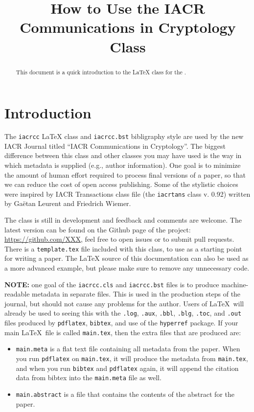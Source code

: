 \documentclass{iacrcc}
\title[running  = {The iacrcc class},
       onclick  = {https://github.com/IACR/latex},
       subtitle = {LaTeX Class Documentation (v0.10)},
      ]
      {How to Use the IACR Communications in Cryptology Class}
\affiliation[ror      = 031v4g827,
             onclick  = {https://www.nxp.com},
             street   = {Interleuvenlaan 80},
             city     = {Leuven},
             postcode = {3001},
             country  = {Belgium}
            ]{NXP Semiconductors}
\affiliation{Self}
\begin{document}
\maketitle


\begin{abstract}
  This document is a quick introduction to the \LaTeX{} class for the
  \publname{}.
\end{abstract}

\tableofcontents{}

\section*{Introduction}

The \texttt{iacrcc} \LaTeX{} class and \texttt{iacrcc.bst} bibligraphy
style are used by the new IACR Journal titled ``IACR Communications in
Cryptology''.  The biggest difference between this class and other
classes you may have used is the way in which metadata is supplied
(e.g., author information). One goal is to minimize the amount of
human effort required to process final versions of a paper, so that
we can reduce the cost of open access publishing.  Some of
the stylistic choices were inspired by IACR Transactions class file (the
\texttt{iacrtans} class v. 0.92) written by Ga{\"e}tan Leurent and
Friedrich Wiemer.

The class is still in development and feedback and comments are welcome.
The latest version can be found on the Github page of the project:
\url{https://github.com/XXX}, feel free to open
issues or to submit pull requests.
There is a \texttt{template.tex} file included with this class, to use
as a starting point for writing a paper.  The \LaTeX{} source of this
documentation can also be used as a more advanced example, but please
make sure to remove any unnecessary code.

\textbf{NOTE:} one goal of the \texttt{iacrcc.cls} and
\texttt{iacrcc.bst} files is to produce machine-readable metadata in
separate files. This is used in the production steps of the journal,
but should not cause any problems for the author.  Users of
\LaTeX\ will already be used to seeing this with the \texttt{.log},
\texttt{.aux}, \texttt{.bbl}, \texttt{.blg}, \texttt{.toc}, and \texttt{.out} files
produced by \texttt{pdflatex}, \texttt{bibtex}, and use of the
\texttt{hyperref} package.  If your main \LaTeX\ file is called
\texttt{main.tex}, then the extra files that are produced are:
\begin{itemize}
\item \texttt{main.meta} is a flat text file containing all metadata from the paper.
  When you run \texttt{pdflatex} on \texttt{main.tex}, it will produce the metadata
  from \texttt{main.tex}, and when you run \texttt{bibtex} and \texttt{pdflatex} again,
  it will append the citation data from bibtex into the \texttt{main.meta} file as well.
\item \texttt{main.abstract} is a file that contains the contents of the abstract
  for the paper.
\end{itemize}
\end{document}
